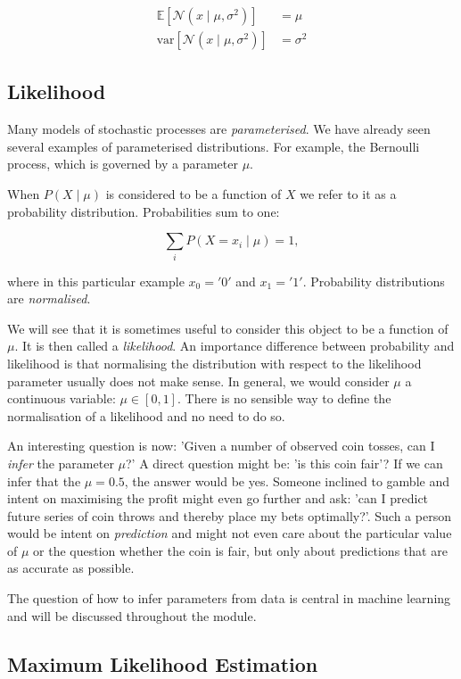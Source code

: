 \begin{align}
\mathbb{E}[\mathcal{N}(x \mid \mu, \sigma^2)] & = \mu \\
\mbox{var} [\mathcal{N}(x \mid \mu, \sigma^2)] & = \sigma^2 \nonumber 
\end{align}


\subsection{Likelihood}

Many models of stochastic processes are \emph{parameterised}.
We have already seen several examples of parameterised distributions. For example, the Bernoulli process, which
is governed by a parameter $\mu$.
    

When $P(X \mid \mu)$ is considered to be a function of $X$ we refer to it as a probability distribution. Probabilities sum to one:

$$
\sum_i P(X = x_i \mid \mu) = 1,
$$

where in this particular example $x_0 = '0'$ and $x_1 ='1'$. Probability distributions are \emph{normalised}.


We will see that it is sometimes useful to consider this object to be a function of $\mu$. It is then called a \emph{likelihood}. An
importance difference between probability and likelihood  is that normalising the distribution with respect to the likelihood parameter usually does not make sense.
In general, we would consider $\mu$ a continuous variable: $\mu \in [0, 1]$. There is no sensible way to define the normalisation of a likelihood and no
need to do so.
  
An interesting question is now: 'Given a number of observed coin tosses, can I \emph{infer} the parameter $\mu$?' A direct question might be: 'is this coin fair'? If
we can infer that the $\mu = 0.5$, the answer would be yes. Someone inclined  to gamble and intent on maximising the profit might even go further and ask:
'can I predict future series of coin throws and thereby place my bets optimally?'. Such a person would be intent on \emph{prediction} and might not even care
about the particular value of $\mu$ or the question whether the coin is fair, but only about predictions that are as accurate as possible.

  
The question of how to infer parameters from data is central in machine learning and will be discussed throughout the module.

\subsection{Maximum Likelihood Estimation}

